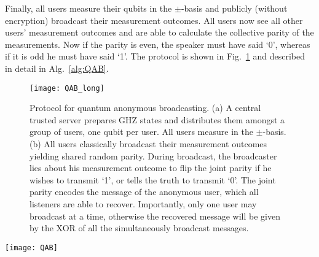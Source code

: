 Finally, all users measure their qubits in the $\pm$-basis and publicly (without encryption) broadcast their measurement outcomes. All users now see all other users' measurement outcomes and are able to calculate the collective parity of the measurements. Now if the parity is even, the speaker must have said `0', whereas if it is odd he must have said `1'. The protocol is shown in Fig.~\ref{fig:QAB} and described in detail in Alg.~\ref{alg:QAB}.

\pubmode
\begin{figure}[!htbp]
\texttt{[image: QAB\_long]}
\captionspacefig \caption{Protocol for quantum anonymous broadcasting. (a) A central trusted server prepares GHZ states and distributes them amongst a group of users, one qubit per user. All users measure in the $\pm$-basis. (b) All users classically broadcast their measurement outcomes yielding shared random parity. During broadcast, the broadcaster lies about his measurement outcome to flip the joint parity if he wishes to transmit `1', or tells the truth to transmit `0'. The joint parity encodes the message of the anonymous user, which all listeners are able to recover. Importantly, only one user may broadcast at a time, otherwise the recovered message will be given by the XOR of all the simultaneously broadcast messages.} \label{fig:QAB}
\end{figure}
\else
\begin{figure*}[!htbp]
\texttt{[image: QAB]}
\captionspacefig \caption{Protocol for quantum anonymous broadcasting. (a) A central trusted server prepares GHZ states and distributes them amongst a group of users, one qubit per user. All users measure in the $\pm$-basis. (b) All users classically broadcast their measurement outcomes yielding shared random parity. During broadcast, the broadcaster lies about his measurement outcome to flip the joint parity if he wishes to transmit `1', or tells the truth to transmit `0'. The joint parity encodes the message of the anonymous user, which all listeners are able to recover. Importantly, only one user may broadcast at a time, otherwise the recovered message will be given by the XOR of all the simultaneously broadcast messages.} \label{fig:QAB}
\end{figure*}
\fi

